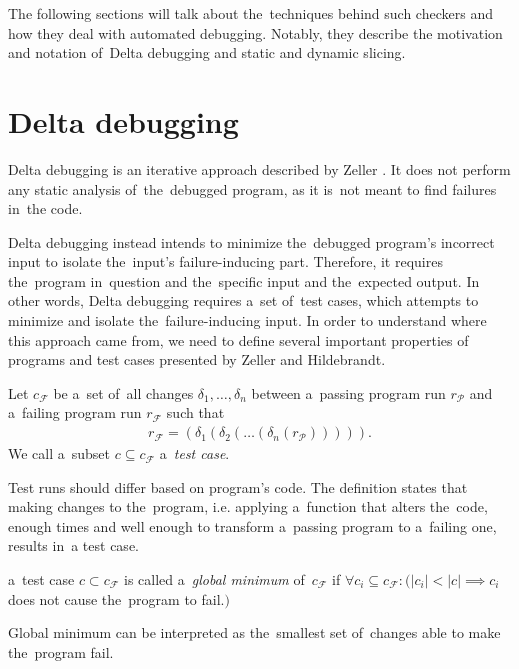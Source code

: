 The following sections will talk about the~techniques behind such checkers 
and how they deal with automated debugging. Notably, they describe
the motivation and notation of~Delta debugging and static and dynamic
slicing.

\section{Delta debugging}

Delta debugging is an iterative approach described by Zeller \citep{Zeller99}.
It does not perform any static analysis of~the~debugged program, as it 
is~not meant to find failures in~the code. 

Delta debugging instead intends to 
minimize the~debugged program's incorrect input to isolate the~input's 
failure-inducing part. 
Therefore, it requires the~program in~question and the~specific input 
and the~expected output. 
In other words, Delta debugging requires a~set of~test cases, which attempts to 
minimize and isolate the~failure-inducing input. 
In order to understand where
this app\-roach came from, we need to define several important properties of~
programs and test cases presented by Zeller and Hildebrandt\citep*{Zeller02}.

\begin{defn}\label{def02:1}
  Let $c_\mathcal{F}$ be a~set of~all changes $\delta_1,\dots,\delta_n$ 
  between a~passing program run $r_\mathcal{P}$ and a~failing program run
  $r_\mathcal{F}$ such that 
  \begin{align}
	r_\mathcal{F} = (\delta_1(\delta_2(\dots(\delta_n(r_\mathcal{P}))))). \nonumber 
  \end{align}
  We call a~subset $c \subseteq c_\mathcal{F}$ a~\emph{test case}.
\end{defn}

Test runs should differ based on program's code. 
The definition states that making changes to the~program,
i.e. applying a~function that alters the~code, enough times
and well enough to transform a~passing program to a~failing one,
results in~a test case.

\begin{defn}\label{def02:2}
  a~test case $c \subset c_\mathcal{F}$ is called a~\emph{global minimum}
  of~$c_\mathcal{F}$ if $\forall c_i \subseteq c_\mathcal{F}:
  (|c_i| < |c| \implies c_i$ does not cause the~program to fail.$)$
\end{defn}

Global minimum can be interpreted as the~smallest set of~changes able to
make the~program fail.

